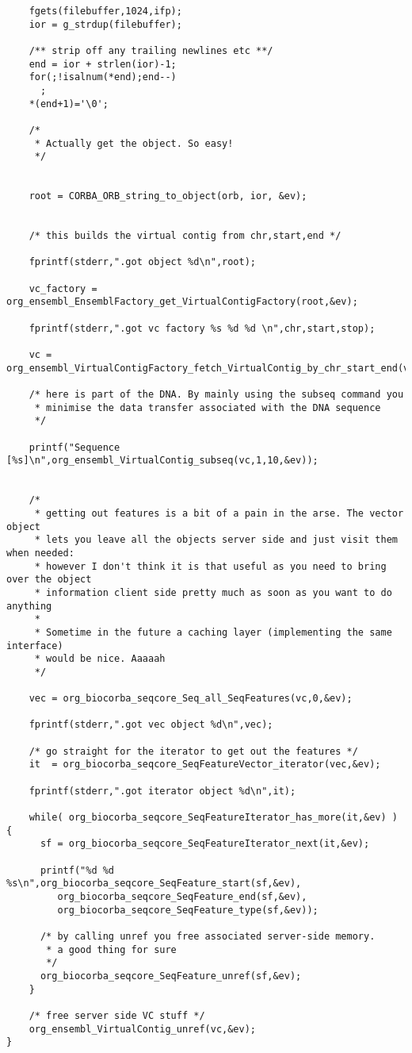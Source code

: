 \documentclass[11pt,a4paper]{article}
\begin{document}
\begin{verbatim}
    fgets(filebuffer,1024,ifp);
    ior = g_strdup(filebuffer);
    
    /** strip off any trailing newlines etc **/
    end = ior + strlen(ior)-1;
    for(;!isalnum(*end);end--) 
      ;
    *(end+1)='\0';

    /*
     * Actually get the object. So easy!
     */

    
    root = CORBA_ORB_string_to_object(orb, ior, &ev);


    /* this builds the virtual contig from chr,start,end */

    fprintf(stderr,".got object %d\n",root);

    vc_factory = org_ensembl_EnsemblFactory_get_VirtualContigFactory(root,&ev);

    fprintf(stderr,".got vc factory %s %d %d \n",chr,start,stop);

    vc = org_ensembl_VirtualContigFactory_fetch_VirtualContig_by_chr_start_end(vc_factory,chr,start,stop,&ev);

    /* here is part of the DNA. By mainly using the subseq command you 
     * minimise the data transfer associated with the DNA sequence
     */

    printf("Sequence [%s]\n",org_ensembl_VirtualContig_subseq(vc,1,10,&ev));


    /*
     * getting out features is a bit of a pain in the arse. The vector object
     * lets you leave all the objects server side and just visit them when needed:
     * however I don't think it is that useful as you need to bring over the object
     * information client side pretty much as soon as you want to do anything
     *
     * Sometime in the future a caching layer (implementing the same interface)
     * would be nice. Aaaaah
     */

    vec = org_biocorba_seqcore_Seq_all_SeqFeatures(vc,0,&ev);

    fprintf(stderr,".got vec object %d\n",vec);

    /* go straight for the iterator to get out the features */
    it  = org_biocorba_seqcore_SeqFeatureVector_iterator(vec,&ev);

    fprintf(stderr,".got iterator object %d\n",it);

    while( org_biocorba_seqcore_SeqFeatureIterator_has_more(it,&ev) ) {
      sf = org_biocorba_seqcore_SeqFeatureIterator_next(it,&ev);

      printf("%d %d %s\n",org_biocorba_seqcore_SeqFeature_start(sf,&ev),
	     org_biocorba_seqcore_SeqFeature_end(sf,&ev),
	     org_biocorba_seqcore_SeqFeature_type(sf,&ev));

      /* by calling unref you free associated server-side memory. 
       * a good thing for sure
       */
      org_biocorba_seqcore_SeqFeature_unref(sf,&ev);
    }

    /* free server side VC stuff */
    org_ensembl_VirtualContig_unref(vc,&ev);
}

\end{verbatim}
\end{document}
